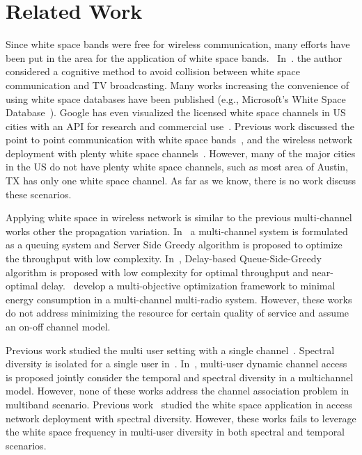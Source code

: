 \section{Related Work}
\label{sec:related}


Since white space bands were free for wireless communication, many efforts have been 
put in the area for the application of white space bands.~\cite{fccwhitespace} 
In~\cite{bahl2009white}. the author considered a cognitive method to avoid collision 
between white space communication and TV broadcasting. 
Many works increasing the convenience of using white space databases have been published 
(e.g., Microsoft's White Space Database~\cite{msdatabase}).
Google has even visualized the licensed white space channels 
in US cities with an API for research and commercial use~\cite{googledatabase}.
Previous work discussed the point to point communication with white space bands~\cite{cui2013leveraging}, 
and the wireless network deployment with plenty white space channels~\cite{pcuiwinmee}.
However, many of the major cities in the US do not have plenty white space channels, such as 
most area of Austin, TX has only one white space channel. As far as we know, there is no work 
discuss these scenarios.


Applying white space in wireless network is similar to the previous multi-channel works other the 
propagation variation. In~\cite{bodas2012low} a multi-channel system is formulated as a queuing 
system and Server Side Greedy algorithm is proposed to optimize the throughput with low complexity. 
In~\cite{ji2013performance}, Delay-based Queue-Side-Greedy algorithm is proposed with low complexity 
for optimal throughput and near-optimal delay.~\cite{liu2014energy} develop a multi-objective optimization 
framework to minimal energy consumption in a multi-channel multi-radio system. 
However, these works do not address minimizing the resource for certain quality of service and assume an 
on-off channel model.

Previous work studied the multi user setting with a single channel~\cite{tan2010distributed}. 
Spectral diversity is isolated for a single user in~\cite{shu2009throughput}. In~\cite{liu2013stay}, 
multi-user dynamic channel access is proposed jointly consider the temporal and spectral diversity in a multichannel model. However, 
none of these works address the channel association problem in multiband scenario.
Previous work~\cite{pcuiwinmee} studied the 
white space application in access network deployment with spectral diversity. However, these works 
fails to leverage the white space frequency in multi-user diversity in both spectral and temporal scenarios.

